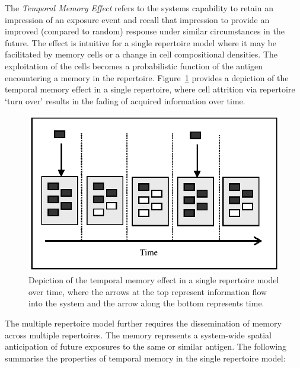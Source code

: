 The \emph{Temporal Memory Effect} refers to the systems capability to retain an impression of an exposure event and recall that impression to provide an improved (compared to random) response under similar circumstances in the future. The effect is intuitive for a single repertoire model where it may be facilitated by memory cells or a change in cell compositional densities. The exploitation of the cells becomes a probabilistic function of the antigen encountering a memory in the repertoire. Figure~\ref{fig:tissues:effects:temporalmemory} provides a depiction of the temporal memory effect in a single repertoire, where cell attrition via repertoire `turn over' results in the fading of acquired information over time.

\begin{figure}[ht]
	\centering
	\includegraphics[scale=0.75]{Tissues/tissues-effects-temporalmemory}
	\caption{Depiction of the temporal memory effect in a single repertoire model over time, where the arrows at the top represent information flow into the system and the arrow along the bottom represents time.}
	\label{fig:tissues:effects:temporalmemory}
\end{figure}

The multiple repertoire model further requires the dissemination of memory across multiple repertoires. The memory represents a system-wide spatial anticipation of future exposures to the same or similar antigen. The following summarise the properties of temporal memory in the single repertoire model:

